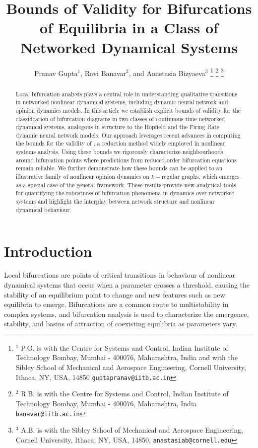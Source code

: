 \documentclass[letterpaper, 10 pt, conference]{ieeeconf}
\title{\bf Bounds of Validity for Bifurcations of Equilibria in a Class of Networked Dynamical Systems}
\author{Pranav Gupta$^1$, Ravi Banavar$^2$, and Anastasia Bizyaeva$^3$%
    \thanks{$^1$ P.G. is with the Centre for Systems and Control, Indian Institute of Technology Bombay, Mumbai - 400076, Maharashtra, India  and with the Sibley School of Mechanical and Aerospace Engineering, Cornell University, Ithaca, NY, USA, 14850 {\tt\small guptapranav@iitb.ac.in}}%
    \thanks{$^2$ R.B. is with the Centre for Systems and Control, Indian Institute of Technology Bombay, Mumbai - 400076, Maharashtra, India {\tt\small banavar@iitb.ac.in}}%
    \thanks{$^3$ A.B. is with the Sibley School of Mechanical and Aerospace Engineering, Cornell University, Ithaca, NY, USA, 14850, {\tt\small anastasiab@cornell.edu}}%
}
\begin{document}
\maketitle
\thispagestyle{empty}
\pagestyle{empty}


\begin{abstract}
    Local bifurcation analysis plays a central role in understanding qualitative transitions in networked nonlinear dynamical systems, including dynamic neural network and opinion dynamics models. In this article we establish explicit bounds of validity for the classification of bifurcation diagrams in two classes of continuous-time networked dynamical systems, analogous in structure to the Hopfield and the Firing Rate dynamic neural network models. Our approach leverages recent advances in computing the bounds for the validity of \LSR{}, a reduction method widely employed in nonlinear systems analysis. Using these bounds we rigorously characterize neighbourhoods around bifurcation points where predictions from reduced-order bifurcation equations remain reliable. We further demonstrate how these bounds can be applied to an illustrative family of nonlinear opinion dynamics on \(k-\)regular graphs, which emerges as a special case of the general framework. These results provide new analytical tools for quantifying the robustness of bifurcation phenomena in dynamics over networked systems and highlight the interplay between network structure and nonlinear dynamical behaviour.
\end{abstract}


\section{Introduction}

Local bifurcations are points of critical transitions in behaviour of nonlinear dynamical systems that occur when a parameter crosses a threshold, causing the stability of an equilibrium point to change and new features such as new equilibria to emerge. Bifurcations are a common route to multistability in complex systems, and bifurcation analysis is used to characterize the emergence, stability, and basins of attraction of coexisting equilibria as parameters vary.
\end{document}
